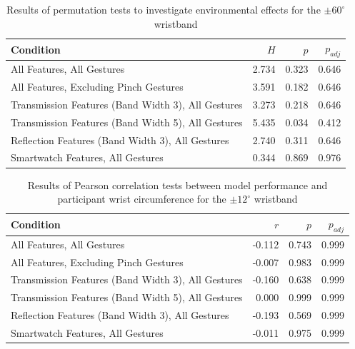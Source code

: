 \documentclass[ oneside,%
                    author={Jack Jarvis},
                    degree={BSc},
                     title={FlexIR: Flexible PCB Wristbands for Infrared Based Gesture Recognition},
                    unit={COMS30045},
                    subtitle={Investigating the Effect of LED Viewing Angle on Gesture Classification in Infrared Sensing Systems}]{dissertation}
\begin{document}
\begin{table}[htp]
    \centering
    \begin{tabular}{lrrr}
        \toprule
        Condition & $H$ & $p$ & $p_{adj}$ \\
        \midrule
        All Features, All Gestures & 2.734 & 0.323 & 0.646 \\
        All Features, Excluding Pinch Gestures & 3.591 & 0.182 & 0.646 \\
        Transmission Features (Band Width 3), All Gestures & 3.273 & 0.218 & 0.646 \\
        Transmission Features (Band Width 5), All Gestures & 5.435 & 0.034 & 0.412 \\
        Reflection Features (Band Width 3), All Gestures & 2.740 & 0.311 & 0.646 \\
        Smartwatch Features, All Gestures & 0.344 & 0.869 & 0.976 \\
        \bottomrule
    \end{tabular}
    \caption{Results of permutation tests to investigate environmental effects for the $\pm 60^\circ$ wristband}
    \label{tab:location_effects_60}
\end{table}

\begin{table}[htp]
    \centering
    \begin{tabular}{lrrr}
        \toprule
        Condition & $r$ & $p$ & $p_{adj}$ \\
        \midrule
        All Features, All Gestures & -0.112 & 0.743 & 0.999 \\
        All Features, Excluding Pinch Gestures & -0.007 & 0.983 & 0.999 \\
        Transmission Features (Band Width 3), All Gestures & -0.160 & 0.638 & 0.999 \\
        Transmission Features (Band Width 5), All Gestures & 0.000 & 0.999 & 0.999 \\
        Reflection Features (Band Width 3), All Gestures & -0.193 & 0.569 & 0.999 \\
        Smartwatch Features, All Gestures & -0.011 & 0.975 & 0.999 \\
        \bottomrule
    \end{tabular}
    \caption{Results of Pearson correlation tests between model performance and participant wrist circumference for the $\pm 12^\circ$ wristband}
    \label{tab:correlation_12}
\end{table}
\end{document}
